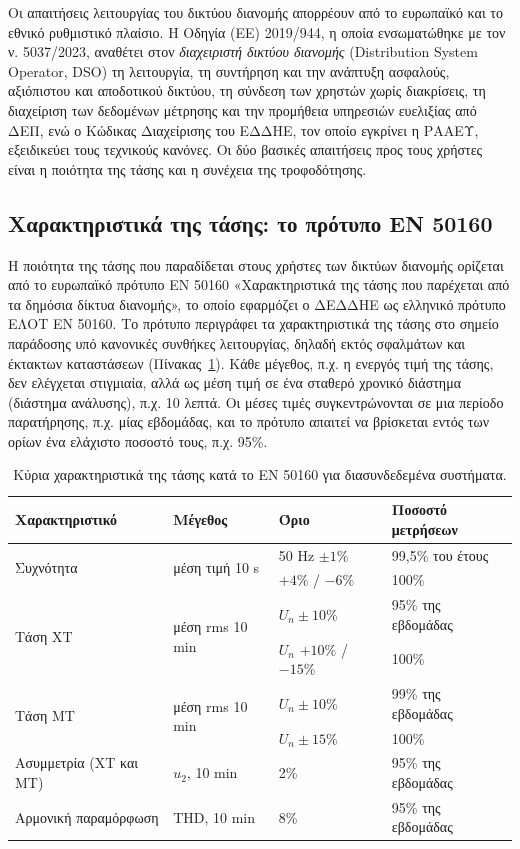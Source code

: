 Οι απαιτήσεις λειτουργίας του δικτύου διανομής απορρέουν από το ευρωπαϊκό και το εθνικό
ρυθμιστικό πλαίσιο. Η Οδηγία (ΕΕ) 2019/944, η οποία ενσωματώθηκε με τον ν. 5037/2023,
αναθέτει στον \emph{διαχειριστή δικτύου διανομής} (Distribution System Operator, DSO) τη
λειτουργία, τη συντήρηση και την ανάπτυξη ασφαλούς, αξιόπιστου και αποδοτικού δικτύου, τη
σύνδεση των χρηστών χωρίς διακρίσεις, τη διαχείριση των δεδομένων μέτρησης και την προμήθεια
υπηρεσιών ευελιξίας από ΔΕΠ, ενώ ο Κώδικας Διαχείρισης του ΕΔΔΗΕ, τον οποίο
εγκρίνει η ΡΑΑΕΥ, εξειδικεύει τους τεχνικούς κανόνες. Οι δύο βασικές απαιτήσεις προς τους
χρήστες είναι η ποιότητα της τάσης και η συνέχεια της τροφοδότησης.

\subsection{Χαρακτηριστικά της τάσης: το πρότυπο EN 50160}
\label{sec:en50160}

Η ποιότητα της τάσης που παραδίδεται στους χρήστες των δικτύων διανομής ορίζεται από το
ευρωπαϊκό πρότυπο EN 50160 «Χαρακτηριστικά της τάσης που παρέχεται από τα δημόσια δίκτυα
διανομής», το οποίο εφαρμόζει ο ΔΕΔΔΗΕ ως ελληνικό πρότυπο ΕΛΟΤ EN 50160. Το
πρότυπο περιγράφει τα χαρακτηριστικά της τάσης στο σημείο παράδοσης υπό κανονικές συνθήκες
λειτουργίας, δηλαδή εκτός σφαλμάτων και έκτακτων καταστάσεων
(Πίνακας~\ref{tab:en50160}). Κάθε μέγεθος, π.χ. η ενεργός τιμή της τάσης, δεν ελέγχεται
στιγμιαία, αλλά ως μέση τιμή σε ένα σταθερό χρονικό διάστημα (διάστημα ανάλυσης), π.χ. 10
λεπτά. Οι μέσες τιμές συγκεντρώνονται σε μια περίοδο παρατήρησης, π.χ. μίας εβδομάδας, και το
πρότυπο απαιτεί να βρίσκεται εντός των ορίων ένα ελάχιστο ποσοστό τους, π.χ. 95\%.

\begin{table}[!htbp]
\centering
\begin{tabular}{llll}
\hline
Χαρακτηριστικό & Μέγεθος & Όριο & Ποσοστό μετρήσεων \\
\hline
\multirow{2}{*}{Συχνότητα} & \multirow{2}{*}{μέση τιμή 10 s} & 50 Hz $\pm 1\%$ & 99,5\% του έτους \\
 & & $+4\%$ / $-6\%$ & 100\% \\
\multirow{2}{*}{Τάση ΧΤ} & \multirow{2}{*}{μέση rms 10 min} & $U_n \pm 10\%$ & 95\% της εβδομάδας \\
 & & $U_n$ $+10\%$ / $-15\%$ & 100\% \\
\multirow{2}{*}{Τάση ΜΤ} & \multirow{2}{*}{μέση rms 10 min} & $U_n \pm 10\%$ & 99\% της εβδομάδας \\
 & & $U_n \pm 15\%$ & 100\% \\
Ασυμμετρία (ΧΤ και ΜΤ) & $u_2$, 10 min & 2\% & 95\% της εβδομάδας \\
Αρμονική παραμόρφωση & THD, 10 min & 8\% & 95\% της εβδομάδας \\
\hline
\end{tabular}
\caption{Κύρια χαρακτηριστικά της τάσης κατά το EN 50160 για διασυνδεδεμένα συστήματα.}
\label{tab:en50160}
\end{table}

